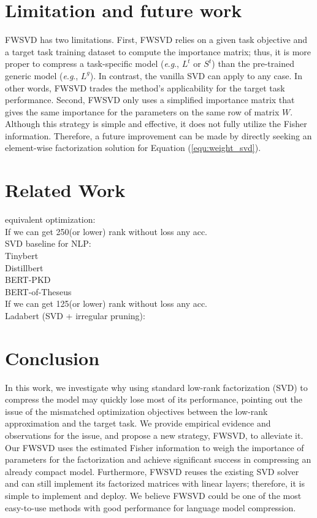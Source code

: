\documentclass{article} %
\newcommand{\eg}{\textit{e}.\textit{g}.}
\begin{document}

\section{Limitation and future work}

FWSVD has two limitations. First, FWSVD relies on a given task objective and a target task training dataset to compute the importance matrix; thus, it is more proper to compress a task-specific model (\eg, $L^t$ or $S^t$) than the pre-trained generic model (\eg, $L^g$). In contrast, the vanilla SVD can apply to any case. In other words, FWSVD trades the method's applicability for the target task performance. Second, FWSVD only uses a simplified importance matrix that gives the same importance for the parameters on the same row of matrix $W$. Although this strategy is simple and effective, it does not fully utilize the Fisher information. Therefore, a future improvement can be made by directly seeking an element-wise factorization solution for Equation (\ref{equ:weight_svd}).

% 
\section{Related Work}
equivalent optimization: \cite{chen2018groupreduce}\\

If we can get 250(or lower) rank without loss any acc.\\
SVD baseline for NLP:\cite{noach2020compressing}\\
Tinybert\\
Distillbert\\
BERT-PKD\\
BERT-of-Theseus \cite{xu-etal-2020-bert}\\


If we can get 125(or lower) rank without loss any acc.\\
Ladabert (SVD + irregular pruning): \cite{mao2020ladabert}


\section{Conclusion}

In this work, we investigate why using standard low-rank factorization (SVD) to compress the model may quickly lose most of its performance, pointing out the issue of the mismatched optimization objectives between the low-rank approximation and the target task. We provide empirical evidence and observations for the issue, and propose a new strategy, FWSVD, to alleviate it. Our FWSVD uses the estimated Fisher information to weigh the importance of parameters for the factorization and achieve significant success in compressing an already compact model. Furthermore, FWSVD reuses the existing SVD solver and can still implement its factorized matrices with linear layers; therefore, it is simple to implement and deploy. We believe FWSVD could be one of the most easy-to-use methods with good performance for language model compression.
\end{document}
